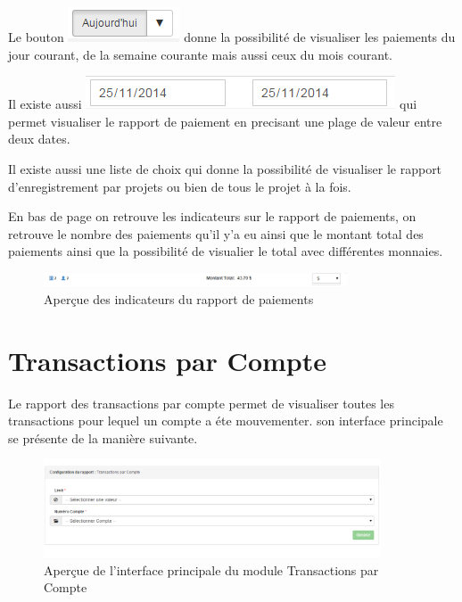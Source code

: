 \documentclass[12pt,a4paper]{report}
\begin{document}
Le bouton \includegraphics[scale=0.7]{pic/Todays.png} donne la possibilité de visualiser les paiements du jour courant, de la semaine courante mais aussi ceux du mois courant. 

Il existe aussi  \includegraphics[scale=0.7]{pic/PlageTimes.png} qui permet visualiser le rapport de paiement en precisant une plage de valeur entre deux dates.

Il existe aussi une liste de choix qui donne la possibilité de visualiser le rapport d'enregistrement par projets ou bien de tous le projet à la fois.

En bas de page on retrouve les indicateurs sur le rapport de paiements, on retrouve le nombre des paiements qu'il y'a eu ainsi que le montant total des paiements ainsi que la possibilité de visualier le total avec différentes monnaies. 

\begin{figure}[h]
\begin{center}
\includegraphics[width=9cm]{pic/IndRapPaiement.png}
\end{center}
\caption{Aperçue des indicateurs du rapport de paiements}
\label{Aperçue des indicateurs du rapport de paiements}
\end{figure}

\newpage
\section{Transactions par Compte}
Le rapport des transactions par compte permet de visualiser toutes les transactions pour lequel un compte a éte mouvementer. son interface principale se présente de la manière suivante. 

\begin{figure}[h]
\begin{center}
\includegraphics[width=10cm]{pic/TransacCompte.png}
\end{center}
\caption{Aperçue de l'interface principale du module Transactions par Compte}
\label{Aperçue de l'interface principale du module Transactions par Compte}
\end{figure}
\end{document}
